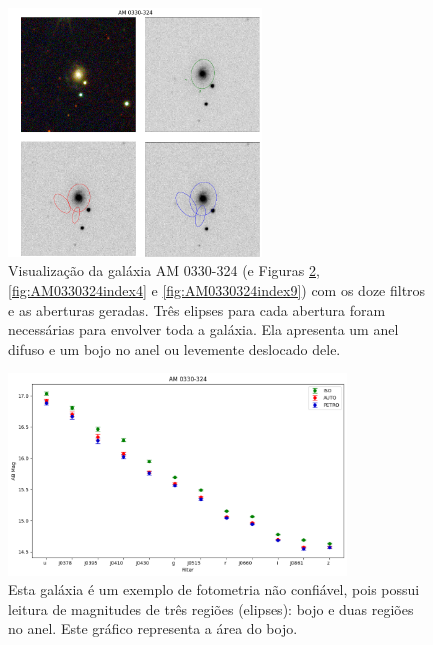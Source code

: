 \begin{figure}[h]
  \centering 
  \includegraphics[width=0.6\textwidth]{Imagens/AM0330324.png} 
  \caption[Galáxia AM 0330-324.]{Visualização da galáxia AM 0330-324 (e Figuras \ref{fig:AM0330324index16}, \ref{fig:AM0330324index4} e \ref{fig:AM0330324index9}) com os doze filtros e as aberturas geradas. Três elipses para cada abertura foram necessárias para envolver toda a galáxia. Ela apresenta um anel difuso e um bojo no anel ou levemente deslocado dele.}
  \label{fig:AM0330324} 
\end{figure}

\begin{figure}[!h]
  \centering 
  \includegraphics[width=0.8\textwidth]{Imagens/AM0330324index16.png} 
  \caption[Magnitudes da galáxia AM 0330-324.]{Esta galáxia é um exemplo de fotometria não confiável, pois possui leitura de magnitudes de três regiões (elipses): bojo e duas regiões no anel. Este gráfico representa a área do bojo.}
  \label{fig:AM0330324index16} 
\end{figure}

